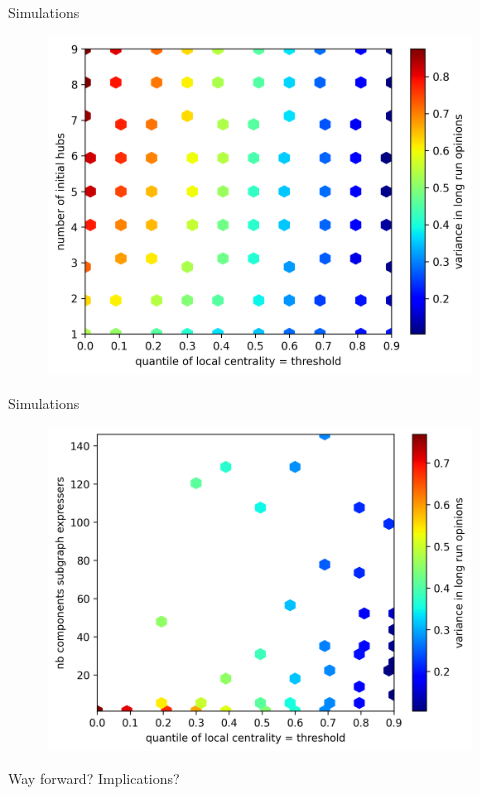 \documentclass[xcolor=table,handout]{beamer}
\begin{document}
\begin{frame}{Simulations}
	\begin{figure}
		\centering
		\includegraphics[scale = 0.75]{./img/heatmap_quantile_hubs.png}
	\end{figure}
\end{frame}

\begin{frame}{Simulations}
	\begin{figure}
		\centering
		\includegraphics[scale = 0.75]{./img/heatmap_quantile_subgraph_comp_exp.png}
	\end{figure}
\end{frame}
%
\begin{frame}{Way forward? Implications?}
\end{frame}
\end{document}
